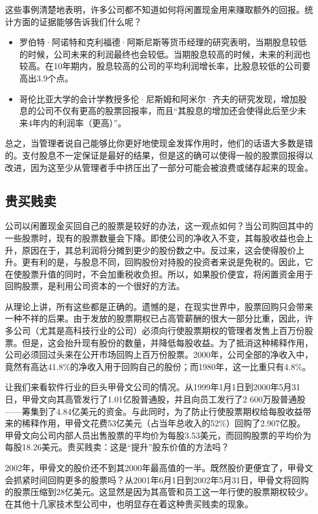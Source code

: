 \documentclass[12pt,oneside]{book}
\begin{document}
这些事例清楚地表明，许多公司都不知道如何将闲置现金用来赚取额外的回报。统计方面的证据能够告诉我们什么呢？

\begin{itemize}
\item 罗伯特·阿诺特和克利福德·阿斯尼斯等货币经理的研究表明，当期股息较低的时候，公司未来的利润最终也会较低。当期股息较高的时候，未来的利润也较高。在10年期内，股息较高的公司的平均利润增长率，比股息较低的公司要高出3.9个点。
\item 哥伦比亚大学的会计学教授多伦·尼斯姆和阿米尔·齐夫的研究发现，增加股息的公司不仅有更高的股票回报率，而且“其股息的增加还会使得此后至少未来4年内的利润率（更高）”。
\end{itemize}

总之，当管理者说自己能够比你更好地使现金发挥作用时，他们的话语大多数是错的。支付股息不一定保证是最好的结果，但是这的确可以使得一般的股票回报得以改进，因为这至少从管理者手中挤压出了一部分可能会被浪费或储存起来的现金。


\subsection{贵买贱卖}
公司以闲置现金买回自己的股票是较好的办法，这一观点如何？当公司购回其中的一些股票时，现有的股票数量会下降。即使公司的净收入不变，其每股收益也会上升，原因在于，其总利润将分摊到更少的股份数之中。反过来，这会使得股价上升。更有利的是，与股息不同，回购股份对持股的投资者来说是免税的。因此，它在使股票升值的同时，不会加重税收负担。所以，如果股价便宜，将闲置资金用于回购股票，是利用公司资本的一个很好的方法。

从理论上讲，所有这些都是正确的。遗憾的是，在现实世界中，股票回购只会带来一种不祥的后果。由于发放的股票期权已占高管薪酬的很大一部分比重，因此，许多公司（尤其是高科技行业的公司）必须向行使股票期权的管理者发售上百万份股票。但是，这会抬升现有股份的数量，并降低每股收益。为了抵消这种稀释作用，公司必须回过头来在公开市场回购上百万份股票。2000年，公司全部的净收入中，竟然有高达41.8\%的净收入用于回购自己的股份；而1980年，这一比重只有4.8\%。

让我们来看软件行业的巨头甲骨文公司的情况。从1999年1月1日到2000年5月31日，甲骨文向其高管发行了1.01亿股普通股，并且向员工发行了2 600万股普通股——筹集到了4.84亿美元的资金。与此同时，为了防止行使股票期权给每股收益带来的稀释作用，甲骨文花费53亿美元（占当年总收入的52\%）回购了2.907亿股。甲骨文向公司内部人员出售股票的平均价为每股3.53美元，而回购股票的平均价为每股18.26美元。贵买贱卖：这是“提升”股东价值的方法吗？

2002年，甲骨文的股价还不到其2000年最高值的一半。既然股价更便宜了，甲骨文会抓紧时间回购更多的股票吗？从2001年6月1日到2002年5月31日，甲骨文将回购的股票压缩到28亿美元。这显然是因为其高管和员工这一年行使的股票期权较少。在其他十几家技术型公司中，也明显存在着这种贵买贱卖的现象。
\end{document}
